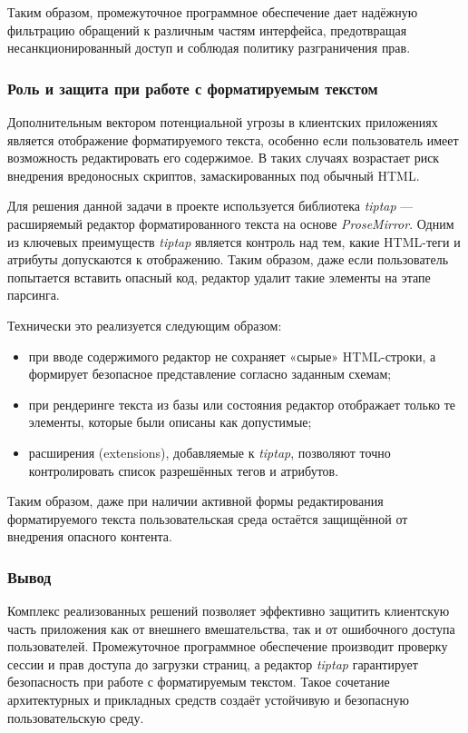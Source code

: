 Таким образом, промежуточное программное обеспечение дает надёжную фильтрацию обращений к различным частям интерфейса, предотвращая несанкционированный доступ и соблюдая политику разграничения прав.

\subsubsection{Роль и защита при работе с форматируемым текстом}
Дополнительным вектором потенциальной угрозы в клиентских приложениях является отображение форматируемого текста, особенно если пользователь имеет возможность редактировать его содержимое. В таких случаях возрастает риск внедрения вредоносных скриптов, замаскированных под обычный HTML.

Для решения данной задачи в проекте используется библиотека \textit{tiptap} — расширяемый редактор форматированного текста на основе \textit{ProseMirror}. Одним из ключевых преимуществ \textit{tiptap} является контроль над тем, какие HTML-теги и атрибуты допускаются к отображению. Таким образом, даже если пользователь попытается вставить опасный код, редактор удалит такие элементы на этапе парсинга.

Технически это реализуется следующим образом:
\begin{itemize}
  \item при вводе содержимого редактор не сохраняет «сырые» HTML-строки, а формирует безопасное представление согласно заданным схемам;
  \item при рендеринге текста из базы или состояния редактор отображает только те элементы, которые были описаны как допустимые;
  \item расширения (extensions), добавляемые к \textit{tiptap}, позволяют точно контролировать список разрешённых тегов и атрибутов.
\end{itemize}

Таким образом, даже при наличии активной формы редактирования форматируемого текста пользовательская среда остаётся защищённой от внедрения опасного контента.

\subsubsection{Вывод}

Комплекс реализованных решений позволяет эффективно защитить клиентскую часть приложения как от внешнего вмешательства, так и от ошибочного доступа пользователей. Промежуточное программное обеспечение производит проверку сессии и прав доступа до загрузки страниц, а редактор \textit{tiptap} гарантирует безопасность при работе с форматируемым текстом. Такое сочетание архитектурных и прикладных средств создаёт устойчивую и безопасную пользовательскую среду.

